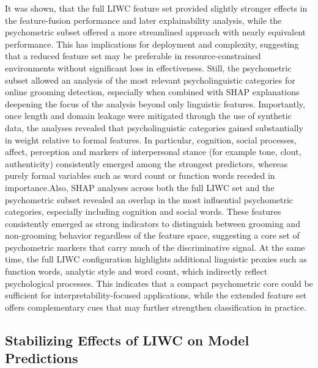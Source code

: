It was shown, that the full LIWC feature set provided slightly stronger effects in the feature-fusion performance and later explainability analysis, while the psychometric subset offered a more streamlined approach with nearly equivalent performance. This has implications for deployment and complexity, suggesting that a reduced feature set may be preferable in resource-constrained environments without significant loss in effectiveness. Still, the psychometric subset allowed an analysis of the most relevant psycholinguistic categories for online grooming detection, especially when combined with SHAP explanations deepening the focus of the analysis beyond only linguistic features. Importantly, once length and domain leakage were mitigated through the use of synthetic data, the analyses revealed that psycholinguistic categories gained substantially in weight relative to formal features. In particular, cognition, social processes, affect, perception and markers of interpersonal stance (for example tone, clout, authenticity) consistently emerged among the strongest predictors, whereas purely formal variables such as word count or function words receded in importance.Also, SHAP analyses across both the full LIWC set and the psychometric subset revealed an overlap in the most influential psychometric categories, especially including cognition and social words. These features consistently emerged as strong indicators to distinguish between grooming and non-grooming behavior regardless of the feature space, suggesting a core set of psychometric markers that carry much of the discriminative signal. At the same time, the full LIWC configuration highlights additional linguistic proxies such as function words, analytic style and word count, which indirectly reflect psychological processes. This indicates that a compact psychometric core could be sufficient for interpretability-focused applications, while the extended feature set offers complementary cues that may further strengthen classification in practice.

\subsection{Stabilizing Effects of LIWC on Model Predictions}

